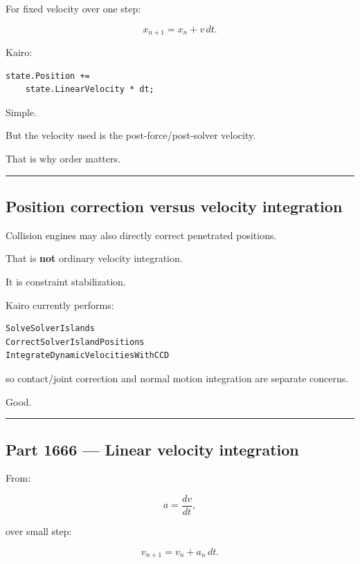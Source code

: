 For fixed velocity over one step:

\[
\boxed{
x_{n+1}
=
x_n+v\,dt.
}
\]

Kairo:

\begin{verbatim}
state.Position +=
    state.LinearVelocity * dt;
\end{verbatim}

Simple.

But the velocity used is the post-force/post-solver velocity.

That is why order matters.

\begin{center}\rule{0.5\linewidth}{0.5pt}\end{center}

\subsection{Position correction versus velocity integration}\label{06-engine-ii-ch037-position-correction-versus-velocity-integration}

Collision engines may also directly correct penetrated positions.

That is \textbf{not} ordinary velocity integration.

It is constraint stabilization.

Kairo currently performs:

\begin{verbatim}
SolveSolverIslands
CorrectSolverIslandPositions
IntegrateDynamicVelocitiesWithCCD
\end{verbatim}

so contact/joint correction and normal motion integration are separate concerns.

Good.

\begin{center}\rule{0.5\linewidth}{0.5pt}\end{center}

\subsection{Part 1666 --- Linear velocity integration}\label{06-engine-ii-ch037-part-1666-linear-velocity-integration}

From:

\[
a=\frac{dv}{dt},
\]

over small step:

\[
\boxed{
v_{n+1}
=
v_n+a_n\,dt.
}
\]

